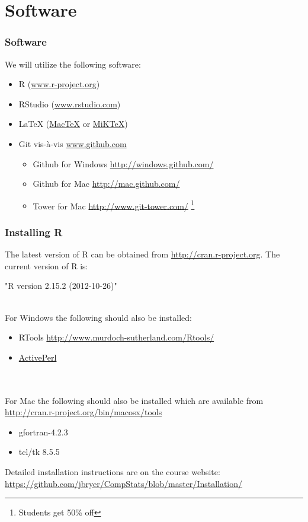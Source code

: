 \documentclass[10pt,slidestop,mathserif,c]{beamer}
\begin{document}
\section{Software}

\begin{frame}
	\frametitle{Software}
	We will utilize the following software:
	\begin{itemize}
		\item R (\url{www.r-project.org})
		\item RStudio (\url{www.rstudio.com})
		\item \LaTeX{} (\href{http://tug.org/mactex/}{MacTeX} or \href{http://miktex.org/}{MiKTeX})
		\item Git vis-\`a-vis \url{www.github.com}
			\begin{itemize}
				\item Github for Windows \url{http://windows.github.com/}
				\item Github for Mac \url{http://mac.github.com/}
				\item Tower for Mac \url{http://www.git-tower.com/} \footnote{Students get 50\% off}
			\end{itemize}
	\end{itemize}
\end{frame}

\begin{frame}
	\frametitle{Installing R}
	The latest version of R can be obtained from \url{http://cran.r-project.org}. The current version of R is:
\begin{Schunk}
\begin{Soutput}
[1] "R version 2.15.2 (2012-10-26)"
\end{Soutput}
\end{Schunk}
	\pause
	\ \\
	For Windows the following should also be installed:
	\begin{itemize}
		\item RTools \url{http://www.murdoch-sutherland.com/Rtools/}
		\item \href{http://downloads.activestate.com/ActivePerl/releases/5.16.1.1601/ActivePerl-5.16.1.1601-MSWin32-x86-296175.msi}{ActivePerl}
	\end{itemize}
	\ \\ \ \\
	For Mac the following should also be installed which are available from \url{http://cran.r-project.org/bin/macosx/tools}
	\begin{itemize}
		\item gfortran-4.2.3
		\item tcl/tk 8.5.5
	\end{itemize}
	\vfill
	Detailed installation instructions are on the course website: \url{https://github.com/jbryer/CompStats/blob/master/Installation/}
\end{frame}
\end{document}
